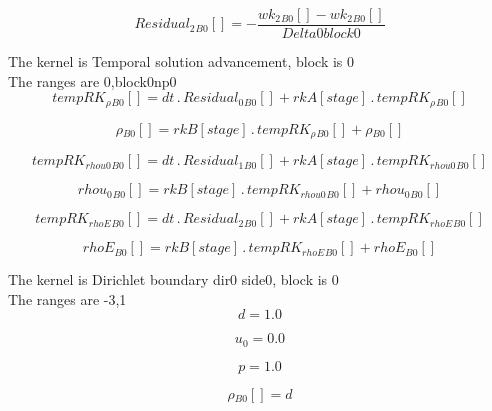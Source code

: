 \documentclass{article}
\begin{document}
\begin{dmath}{Residual_{2}{_{B0}}}[{}] = - \frac{{wk_{2}{_{B0}}}[{}] - {wk_{2}{_{B0}}}[{}]}{Delta0block0}\end{dmath}

\noindent The kernel is Temporal solution advancement, block is 0\\\noindent The ranges are 0,block0np0\\\begin{dmath}{tempRK_{\rho}{_{B0}}}[{}] = dt \,.\, {Residual_{0}{_{B0}}}[{}] + {rkA}[{stage}] \,.\, {tempRK_{\rho}{_{B0}}}[{}]\end{dmath}

\begin{dmath}{\rho{_{B0}}}[{}] = {rkB}[{stage}] \,.\, {tempRK_{\rho}{_{B0}}}[{}] + {\rho{_{B0}}}[{}]\end{dmath}

\begin{dmath}{tempRK_{rhou0}{_{B0}}}[{}] = dt \,.\, {Residual_{1}{_{B0}}}[{}] + {rkA}[{stage}] \,.\, {tempRK_{rhou0}{_{B0}}}[{}]\end{dmath}

\begin{dmath}{rhou_{0}{_{B0}}}[{}] = {rkB}[{stage}] \,.\, {tempRK_{rhou0}{_{B0}}}[{}] + {rhou_{0}{_{B0}}}[{}]\end{dmath}

\begin{dmath}{tempRK_{rhoE}{_{B0}}}[{}] = dt \,.\, {Residual_{2}{_{B0}}}[{}] + {rkA}[{stage}] \,.\, {tempRK_{rhoE}{_{B0}}}[{}]\end{dmath}

\begin{dmath}{rhoE{_{B0}}}[{}] = {rkB}[{stage}] \,.\, {tempRK_{rhoE}{_{B0}}}[{}] + {rhoE{_{B0}}}[{}]\end{dmath}

\noindent The kernel is Dirichlet boundary dir0 side0, block is 0\\\noindent The ranges are -3,1\\\begin{dmath}d = 1.0\end{dmath}

\begin{dmath}u_{0} = 0.0\end{dmath}

\begin{dmath}p = 1.0\end{dmath}

\begin{dmath}{\rho{_{B0}}}[{}] = d\end{dmath}
\end{document}
